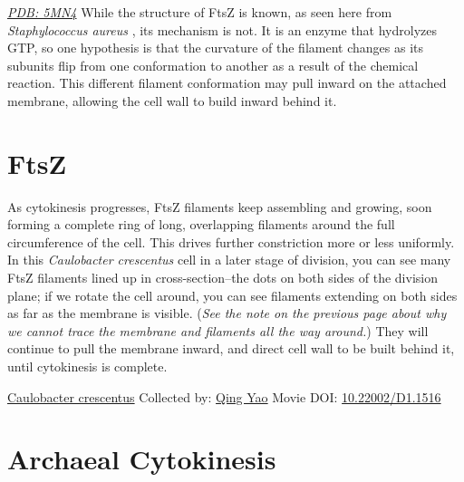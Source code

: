 \documentclass[]{tufte-book}
\begin{document}
\href{http://rcsb.org/structure/5MN4}{\emph{PDB: 5MN4}}
While the structure of FtsZ is known, as seen here from \emph{Staphylococcus aureus} \citep{wagstaff2017}, its mechanism is not. It is an enzyme that hydrolyzes GTP, so one hypothesis is that the curvature of the filament changes as its subunits flip from one conformation to another as a result of the chemical reaction. This different filament conformation may pull inward on the attached membrane, allowing the cell wall to build inward behind it.

\hypertarget{ftsz}{%
\section{FtsZ}\label{ftsz}}

As cytokinesis progresses, FtsZ filaments keep assembling and growing, soon forming a complete ring of long, overlapping filaments around the full circumference of the cell. This drives further constriction more or less uniformly. In this \emph{Caulobacter crescentus} cell in a later stage of division, you can see many FtsZ filaments lined up in cross-section--the dots on both sides of the division plane; if we rotate the cell around, you can see filaments extending on both sides as far as the membrane is visible. (\emph{See the note on the previous page about why we cannot trace the membrane and filaments all the way around.}) They will continue to pull the membrane inward, and direct cell wall to be built behind it, until cytokinesis is complete.



\hypertarget{htmlwidget-4f862ba78b95d0011039}{}

\label{fig:5-10}\protect\hyperlink{tree}{Caulobacter crescentus} Collected by: \protect\hyperlink{qing_yao}{Qing Yao} Movie DOI: \href{https://doi.org/10.22002/D1.1516}{10.22002/D1.1516}

\hypertarget{archaeal-cytokinesis}{%
\section{Archaeal Cytokinesis}\label{archaeal-cytokinesis}}
\end{document}
